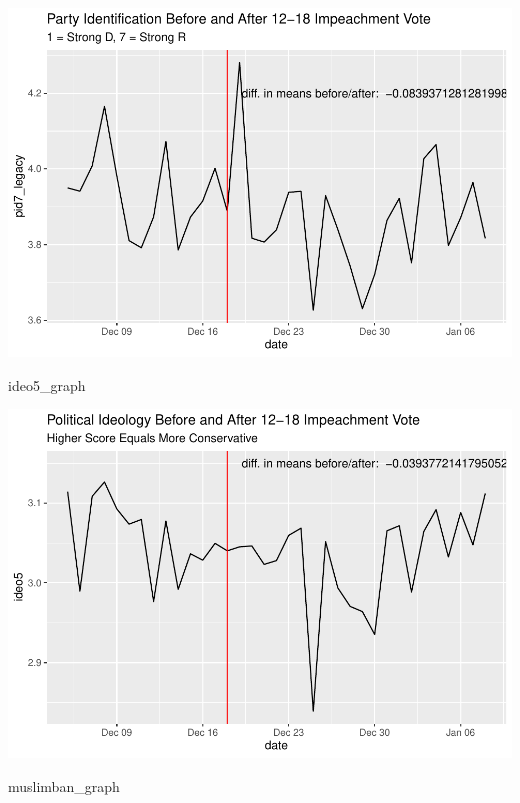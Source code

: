 \documentclass[
]{article}
\newenvironment{Shaded}{\begin{snugshade}}{\end{snugshade}}
\newcommand{\NormalTok}[1]{#1}
\begin{document}
\includegraphics{data_assignment10_nov_11_2021_files/figure-latex/graphing-3.pdf}

\begin{Shaded}
\begin{Highlighting}[]
\NormalTok{ideo5_graph}
\end{Highlighting}
\end{Shaded}

\includegraphics{data_assignment10_nov_11_2021_files/figure-latex/graphing-4.pdf}

\begin{Shaded}
\begin{Highlighting}[]
\NormalTok{muslimban_graph}
\end{Highlighting}
\end{Shaded}
\end{document}
